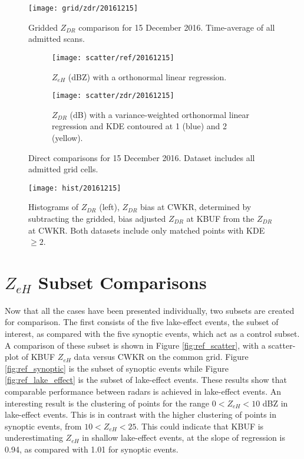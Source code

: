 \begin{figure}[p]
\texttt{[image: grid/zdr/20161215]}
\caption{Gridded $Z_{DR}$ comparison for 15 December 2016. Time-average of all admitted scans.} 
\label{fig:grid_zdr_20161215}
\end{figure}

\begin{figure}[p]
\centering
   \begin{subfigure}[t]{0.48\linewidth} \centering
     \texttt{[image: scatter/ref/20161215]}
     \caption{$Z_{eH}$ (dBZ) with a orthonormal linear regression.}\label{fig:scatter_ref_20161215}
   \end{subfigure}
   \begin{subfigure}[t]{0.48\linewidth} \centering
     \texttt{[image: scatter/zdr/20161215]}
     \caption{$Z_{DR}$ (dB) with a variance-weighted orthonormal linear regression and KDE contoured at 1 (blue) and 2 (yellow).}\label{fig:scatter_zdr_20161215}
   \end{subfigure}
\caption{Direct comparisons for 15 December 2016. Dataset includes all admitted grid cells.} \label{fig:scatter_20161215}
\end{figure}

\begin{figure}[p]
\texttt{[image: hist/20161215]}\centering
\caption{Histograms of $Z_{DR}$ (left), $Z_{DR}$ bias at CWKR, determined by subtracting the gridded, bias adjusted $Z_{DR}$ at KBUF from the $Z_{DR}$ at
CWKR. Both datasets include only matched points with KDE $\geq 2$. } 
\label{fig:hist_20161215}
\end{figure}

\section{$Z_{eH}$ Subset Comparisons}
Now that all the cases have been presented individually, two subsets are created for comparison. The first consists of the five lake-effect events, the
subset of interest, as compared with the five synoptic events, which act as a control subset.
A comparison of these subset is shown in Figure \ref{fig:ref_scatter}, with a scatter-plot of KBUF $Z_{eH}$ data versus CWKR on the common grid. Figure
\ref{fig:ref_synoptic} is the subset of synoptic events while Figure \ref{fig:ref_lake_effect} is the subset of lake-effect events. These results show that
comparable performance between radars is achieved in lake-effect events. An interesting result is the clustering of points for the range $0 < Z_{eH} < 10$
dBZ in lake-effect events. This is in contrast with the higher clustering of points in synoptic events, from $10 < Z_{eH} < 25$. This could indicate that
KBUF is underestimating $Z_{eH}$ in shallow lake-effect events, at the slope of regression is 0.94, as compared with 1.01 for synoptic events.

